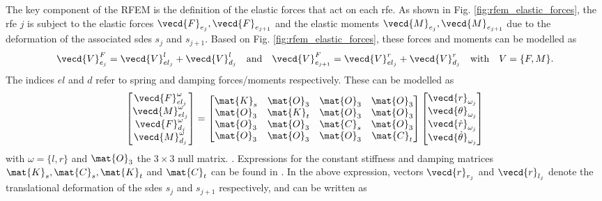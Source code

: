 The key component of the RFEM is the definition of the elastic forces that
act on each rfe. As shown in Fig. \ref{fig:rfem_elastic_forces}, the rfe
$j$ is subject to the elastic forces $\vecd{F}_{e_{j}}, \vecd{F}_{e_{j+1}}$ and
the elastic moments $\vecd{M}_{e_{j}}, \vecd{M}_{e_{j+1}}$ due to the
deformation of the associated sdes $s_{j}$ and $s_{j+1}$.  Based on Fig.
\ref{fig:rfem_elastic_forces}, these forces and moments can be modelled as
\cite{kaminski_application_2013}
\begin{equation}
    \vecd{V}_{e_{j}}^{F} = \vecd{V}_{{el}_j}^{l} + \vecd{V}_{d_j}^{l}
    \quad \text{and} \quad \vecd{V}_{e_{j+1}}^{F} = \vecd{V}_{{el}_j}^{r} +
    \vecd{V}_{d_j}^{r} \quad \text{with} \quad V=\{F, M\}.
    \label{eq:rfem_elastic_forces_moments}
\end{equation}
The indices $el$ and ${d}$ refer to spring and damping forces/moments
respectively. These can be modelled as
\begin{equation}
    \begin{bmatrix}
        \vecd{F}_{{el}_j}^{\omega} \\
        \vecd{M}_{{el}_j}^{\omega} \\
        \vecd{F}_{d_j}^{\omega} \\
        \vecd{M}_{d_j}^{\omega}
    \end{bmatrix} = 
    \begin{bmatrix}
        \mat{K}_{s} & \mat{O}_{3} & \mat{O}_{3} & \mat{O}_{3}\\
        \mat{O}_{3} & \mat{K}_{t} & \mat{O}_{3} & \mat{O}_{3} \\
        \mat{O}_{3} & \mat{O}_{3} & \mat{C}_{s} & \mat{O}_{3} \\
        \mat{O}_{3} & \mat{O}_{3} & \mat{O}_{3} & \mat{C}_{t}
    \end{bmatrix}
    \begin{bmatrix}
        \vecd{r}_{\omega_j} \\
        \vecd{\theta}_{\omega_j} \\
        \vecd{\dot{r}}_{\omega_j} \\
        \vecd{\dot{\theta}}_{\omega_j}
    \end{bmatrix}
    \label{eq:elastic_forces}
\end{equation}
\noindent with $\omega=\{l, r\}$ and $\mat{O}_{3}$ the $3\times 3$ null matrix.
. Expressions for the constant stiffness and damping matrices $\mat{K}_{s}, \mat{C}_{s}, \mat{K}_{t}$ and $\mat{C}_{t}$ can be found in \cite[pp. 69-82]{wittbrodt2007dynamics}. In the above expression, vectors $\vecd{r}_{r_j}$ and $\vecd{r}_{l_j}$ denote the translational deformation of the sdes $s_j$ and $s_{j+1}$ respectively, and can be written as
